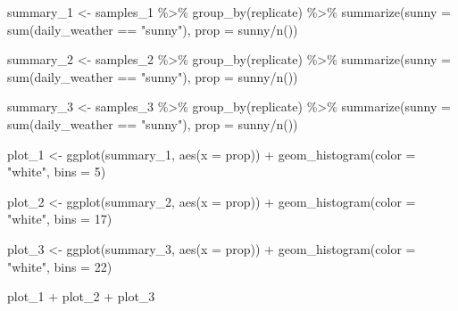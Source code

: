 \documentclass[
  letterpaper,
  DIV=11,
  numbers=noendperiod]{scrreprt}
\newenvironment{Shaded}{\begin{snugshade}}{\end{snugshade}}
\newcommand{\AttributeTok}[1]{\textcolor[rgb]{0.40,0.45,0.13}{#1}}
\newcommand{\DecValTok}[1]{\textcolor[rgb]{0.68,0.00,0.00}{#1}}
\newcommand{\FunctionTok}[1]{\textcolor[rgb]{0.28,0.35,0.67}{#1}}
\newcommand{\NormalTok}[1]{\textcolor[rgb]{0.00,0.23,0.31}{#1}}
\newcommand{\OtherTok}[1]{\textcolor[rgb]{0.00,0.23,0.31}{#1}}
\newcommand{\SpecialCharTok}[1]{\textcolor[rgb]{0.37,0.37,0.37}{#1}}
\newcommand{\StringTok}[1]{\textcolor[rgb]{0.13,0.47,0.30}{#1}}
\theoremstyle{definition}
\theoremstyle{remark}
\begin{document}
\begin{Shaded}
\begin{Highlighting}[]
\NormalTok{summary\_1 }\OtherTok{\textless{}{-}}\NormalTok{ samples\_1 }\SpecialCharTok{\%\textgreater{}\%} 
  \FunctionTok{group\_by}\NormalTok{(replicate) }\SpecialCharTok{\%\textgreater{}\%} 
  \FunctionTok{summarize}\NormalTok{(}\AttributeTok{sunny =} \FunctionTok{sum}\NormalTok{(daily\_weather }\SpecialCharTok{==} \StringTok{"sunny"}\NormalTok{),}
            \AttributeTok{prop =}\NormalTok{ sunny}\SpecialCharTok{/}\FunctionTok{n}\NormalTok{())}

\NormalTok{summary\_2 }\OtherTok{\textless{}{-}}\NormalTok{ samples\_2 }\SpecialCharTok{\%\textgreater{}\%} 
  \FunctionTok{group\_by}\NormalTok{(replicate) }\SpecialCharTok{\%\textgreater{}\%} 
  \FunctionTok{summarize}\NormalTok{(}\AttributeTok{sunny =} \FunctionTok{sum}\NormalTok{(daily\_weather }\SpecialCharTok{==} \StringTok{"sunny"}\NormalTok{),}
            \AttributeTok{prop =}\NormalTok{ sunny}\SpecialCharTok{/}\FunctionTok{n}\NormalTok{())}

\NormalTok{summary\_3 }\OtherTok{\textless{}{-}}\NormalTok{ samples\_3 }\SpecialCharTok{\%\textgreater{}\%} 
  \FunctionTok{group\_by}\NormalTok{(replicate) }\SpecialCharTok{\%\textgreater{}\%} 
  \FunctionTok{summarize}\NormalTok{(}\AttributeTok{sunny =} \FunctionTok{sum}\NormalTok{(daily\_weather }\SpecialCharTok{==} \StringTok{"sunny"}\NormalTok{),}
            \AttributeTok{prop =}\NormalTok{ sunny}\SpecialCharTok{/}\FunctionTok{n}\NormalTok{())}
\end{Highlighting}
\end{Shaded}

\begin{Shaded}
\begin{Highlighting}[]
\NormalTok{plot\_1 }\OtherTok{\textless{}{-}} \FunctionTok{ggplot}\NormalTok{(summary\_1, }\FunctionTok{aes}\NormalTok{(}\AttributeTok{x =}\NormalTok{ prop)) }\SpecialCharTok{+}
  \FunctionTok{geom\_histogram}\NormalTok{(}\AttributeTok{color =} \StringTok{"white"}\NormalTok{, }\AttributeTok{bins =} \DecValTok{5}\NormalTok{)}

\NormalTok{plot\_2 }\OtherTok{\textless{}{-}} \FunctionTok{ggplot}\NormalTok{(summary\_2, }\FunctionTok{aes}\NormalTok{(}\AttributeTok{x =}\NormalTok{ prop)) }\SpecialCharTok{+}
  \FunctionTok{geom\_histogram}\NormalTok{(}\AttributeTok{color =} \StringTok{"white"}\NormalTok{, }\AttributeTok{bins =} \DecValTok{17}\NormalTok{)}

\NormalTok{plot\_3 }\OtherTok{\textless{}{-}} \FunctionTok{ggplot}\NormalTok{(summary\_3, }\FunctionTok{aes}\NormalTok{(}\AttributeTok{x =}\NormalTok{ prop)) }\SpecialCharTok{+}
  \FunctionTok{geom\_histogram}\NormalTok{(}\AttributeTok{color =} \StringTok{"white"}\NormalTok{, }\AttributeTok{bins =} \DecValTok{22}\NormalTok{)}

\NormalTok{plot\_1 }\SpecialCharTok{+}\NormalTok{ plot\_2 }\SpecialCharTok{+}\NormalTok{ plot\_3}
\end{Highlighting}
\end{Shaded}
\end{document}
